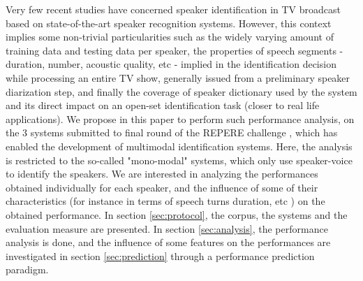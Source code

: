 Very few recent studies  have concerned speaker identification in TV broadcast based on state-of-the-art speaker recognition systems. However, this context implies some non-trivial particularities such as the widely varying amount of training data and testing data per speaker, the properties of speech segments - duration, number, acoustic quality, etc - implied in the identification decision while processing an entire TV show, generally issued from a preliminary speaker diarization step, and finally the coverage of speaker dictionary used by the system and its direct impact on an open-set identification task (closer to real life applications). We propose in this paper to perform such performance analysis, on the 3 systems submitted to final round of the REPERE challenge \cite{KAHN--CBMI--2012}, which has enabled the development of multimodal identification systems. Here, the analysis is restricted to the so-called "mono-modal" systems, which only use speaker-voice to identify the speakers. We are interested in analyzing the performances obtained individually for each speaker, and the influence of some of their characteristics (for instance in terms of speech turns duration, etc ) on the obtained performance. In section \ref{sec:protocol}, the corpus, the systems and the evaluation measure are presented. In section \ref{sec:analysis}, the performance analysis is done, and the influence of some features on the performances are investigated in section \ref{sec:prediction} through a performance prediction paradigm.